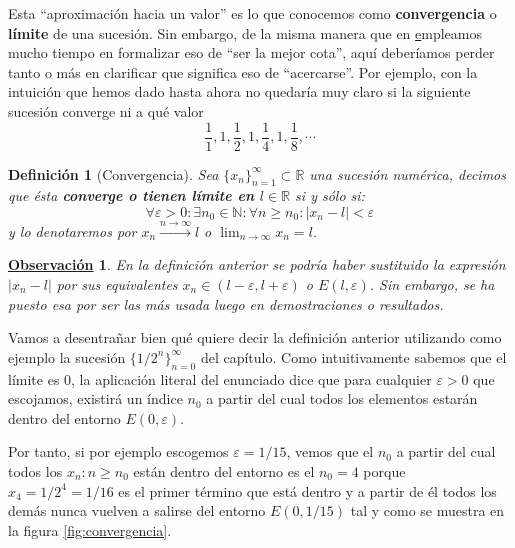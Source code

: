 \documentclass[10pt,a4paper,openright]{book}
\theoremstyle{break}
\newtheorem{defi}{Definición}[chapter]
\newtheorem{obs}{\underline{Observación}}[chapter]
\begin{document}
Esta ``aproximación hacia un valor'' es lo que conocemos como \textbf{convergencia} o \textbf{límite} de una sucesión. Sin embargo, de la misma manera que en \href{chap: supremo e infimo} empleamos mucho tiempo en formalizar eso de ``ser la mejor cota'', aquí deberíamos perder tanto o más en clarificar que significa eso de ``acercarse''. Por ejemplo, con la intuición que hemos dado hasta ahora no quedaría muy claro si la siguiente sucesión converge ni a qué valor
\[
\frac{1}{1}, 1, \frac{1}{2}, 1, \frac{1}{4}, 1, \frac{1}{8}, \cdots
\]

\begin{defi}[Convergencia]
Sea $\{x_n\}_{n=1}^{\infty}\subset \mathbb R$ una sucesión numérica, decimos que ésta \textbf{converge o tienen límite en $l\in \mathbb R$} si y sólo si:
$$\forall \varepsilon>0: \exists n_0\in \mathbb N : \forall n\geq n_0: |x_n-l|<\varepsilon$$
y lo denotaremos por $x_n \xrightarrow{n\rightarrow \infty}l$ o $\lim_{n\rightarrow\infty}x_n = l$.
\end{defi}

\begin{obs}
	En la definición anterior se podría haber sustituido la expresión $|x_n-l|$ por sus equivalentes $x_n\in (l-\varepsilon, l+\varepsilon)$ o $E(l,\varepsilon)$. Sin embargo, se ha puesto esa por ser las más usada luego en demostraciones o resultados.
\end{obs}

Vamos a desentrañar bien qué quiere decir la definición anterior utilizando como ejemplo la sucesión $\{1/2^n\}_{n=0}^\infty$ del capítulo. Como intuitivamente sabemos que el límite es $0$, la aplicación literal del enunciado dice que para cualquier $\varepsilon > 0$ que escojamos, existirá un índice $n_0$ a partir del cual todos los elementos estarán dentro del entorno $E(0,\varepsilon)$.

Por tanto, si por ejemplo escogemos $\varepsilon = 1/15$, vemos que el $n_0$ a partir del cual todos los $x_n : n\geq n_0$ están dentro del entorno es el $n_0=4$ porque $x_4 = 1/2^4 = 1/16$ es el primer término que está dentro y a partir de él todos los demás nunca vuelven a salirse del entorno $E(0, 1/15)$ tal y como se muestra en la figura \ref{fig:convergencia}.
\end{document}
